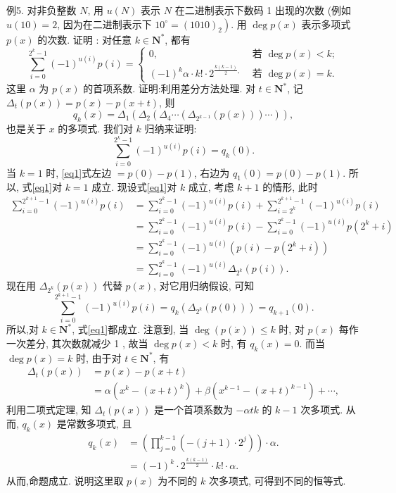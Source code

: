 例5. 对非负整数 $N$, 用 $u(N)$ 表示 $N$ 在二进制表示下数码 1 出现的次数 (例如 $u(10)=2$, 因为在二进制表示下 $\left.10^{\circ}=(1010)_2\right)$. 用 $\operatorname{deg} p(x)$ 表示多项式 $p(x)$ 的次数.
证明 : 对任意 $k \in \mathbf{N}^*$, 都有
$$
\sum_{i=0}^{2^k-1}(-1)^{u(i)} p(i)= \begin{cases}0, & \text { 若 } \operatorname{deg} p(x)<k ; \\ (-1)^k \alpha \cdot k ! \cdot 2^{\frac{k(k-1)}{2},} & \text { 若 } \operatorname{deg} p(x)=k .\end{cases}
$$
这里 $\alpha$ 为 $p(x)$ 的首项系数.
证明:利用差分方法处理.
对 $t \in \mathbf{N}^*$, 记 $\Delta_t(p(x))=p(x)-p(x+t)$, 则
$$
q_k(x)=\Delta_1\left(\Delta_2\left(\Delta_4 \cdots\left(\Delta_{2^{k-1}}(p(x))\right) \cdots\right)\right),
$$
也是关于 $x$ 的多项式.
我们对 $k$ 归纳来证明:
$$
\sum_{i=0}^{2^k-1}(-1)^{u(i)} p(i)=q_k(0) . \label{eq1}
$$
当 $k=1$ 时, \ref{eq1}式左边 $=p(0)-p(1)$, 右边为 $q_1(0)=p(0)-p(1)$. 所以, 式\ref{eq1}对 $k=1$ 成立.
现设式\ref{eq1}对 $k$ 成立, 考虑 $k+1$ 的情形, 此时
$$
\begin{aligned}
\sum_{i=0}^{2^{k+1}-1}(-1)^{u(i)} p(i) & =\sum_{i=0}^{2^k-1}(-1)^{u(i)} p(i)+\sum_{i=2^k}^{2^{k+1}-1}(-1)^{u(i)} p(i) \\
& =\sum_{i=0}^{2^k-1}(-1)^{u(i)} p(i)-\sum_{i=0}^{2^k-1}(-1)^{u(i)} p\left(2^k+i\right) \\
& =\sum_{i=0}^{2^k-1}(-1)^{u(i)}\left(p(i)-p\left(2^k+i\right)\right) \\
& =\sum_{i=0}^{2^k-1}(-1)^{u(i)} \Delta_{2^k}(p(i)) .
\end{aligned}
$$
现在用 $\Delta_{2^k}(p(x))$ 代替 $p(x)$, 对它用归纳假设, 可知
$$
\sum_{i=0}^{2^{k+1}-1}(-1)^{u(i)} p(i)=q_k\left(\Delta_{2^k}(p(0))\right)=q_{k+1}(0) .
$$
所以,对 $k \in \mathbf{N}^*$, 式\ref{eq1}都成立.
注意到, 当 $\operatorname{deg}(p(\dot{x})) \leqslant k$ 时, 对 $p(x)$ 每作一次差分, 其次数就减少 1 , 故当 $\operatorname{deg} p(x)<k$ 时, 有 $q_k(x)=0$. 而当 $\operatorname{deg} p(x)=k$ 时, 由于对 $t \in \mathbf{N}^*$, 有
$$
\begin{aligned}
\Delta_t(p(x)) & =p(x)-p(x+t) \\
& =\alpha\left(x^k-(x+t)^k\right)+\beta\left(x^{k-1}-(x+t)^{k-1}\right)+\cdots,
\end{aligned}
$$
利用二项式定理, 知 $\Delta_t(p(x))$ 是一个首项系数为 $-\alpha t k$ 的 $k-1$ 次多项式.
从而, $q_k(x)$ 是常数多项式, 且
$$
\begin{aligned}
q_k(x) & =\left(\prod_{j=0}^{k-1}\left(-(j+1) \cdot 2^j\right)\right) \cdot \alpha . \\
& =(-1)^k \cdot 2^{\frac{k(k-1)}{2}} \cdot k ! \cdot \alpha .
\end{aligned}
$$
从而,命题成立.
说明这里取 $p(x)$ 为不同的 $k$ 次多项式, 可得到不同的恒等式.



